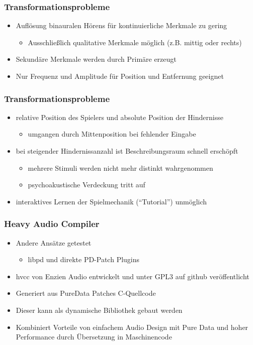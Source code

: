 \documentclass{beamer}
\begin{document}
\begin{frame}
\frametitle{Transformationsprobleme}
\begin{itemize}
	\item Auflösung binauralen Hörens für kontinuierliche Merkmale zu gering
	\begin{itemize}
		\item Ausschließlich qualitative Merkmale möglich (z.B. mittig oder rechts)
	\end{itemize}
	\item Sekundäre Merkmale werden durch Primäre erzeugt
	\item Nur Frequenz und Amplitude für Position und Entfernung geeignet
\end{itemize}
\end{frame}

\begin{frame}
\frametitle{Transformationsprobleme}
\begin{itemize}
	\item relative Position des Spielers und absolute Position der Hindernisse
	\begin{itemize}
		\item umgangen durch Mittenposition bei fehlender Eingabe
	\end{itemize}
	\item bei steigender Hindernissanzahl ist Beschreibungsraum schnell
	erschöpft
	\begin{itemize}
		\item mehrere Stimuli werden nicht mehr distinkt wahrgenommen
		\item psychoakustische Verdeckung tritt auf
	\end{itemize}
	\item interaktives Lernen der Spielmechanik ("`Tutorial"') unmöglich
\end{itemize}
\end{frame}

\begin{frame}
\frametitle{Heavy Audio Compiler}
\begin{itemize}
	\item Andere Ansätze getestet
		\begin{itemize}
			\item libpd und direkte PD-Patch Plugins	
		\end{itemize}
	\item hvcc von Enzien Audio entwickelt und unter GPL3 auf github 
	veröffentlicht
	\item Generiert aus PureData Patches C-Quellcode
	\item Dieser kann als dynamische Bibliothek gebaut werden
	\item Kombiniert Vorteile von einfachem Audio Design mit Pure Data und 
	hoher Performance durch Übersetzung in Maschinencode
\end{itemize}
\end{frame}
\end{document}
